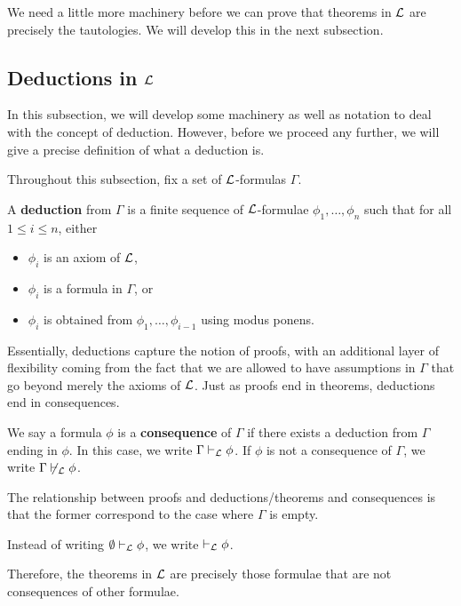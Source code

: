 We need a little more machinery before we can prove that theorems in $\mathcal{L}$ are precisely the tautologies. We will develop this in the next subsection.

\subsection{Deductions in $\mathcal{L}$}

In this subsection, we will develop some machinery as well as notation to deal with the concept of deduction. However, before we proceed any further, we will give a precise definition of what a deduction is.

Throughout this subsection, fix a set of $\mathcal{L}$-formulas $\Gamma$.

\begin{boxdefinition}[Deduction]\label{Ch1:Def:Deduction}
    A \textbf{deduction} from $\Gamma$ is a finite sequence of $\mathcal{L}$-formulae $\phi_1, \ldots, \phi_n$ such that for all $1 \leq i \leq n$, either
    \begin{itemize}%
        \item $\phi_i$ is an axiom of $\mathcal{L}$,
        \item $\phi_i$ is a formula in $\Gamma$, or
        \item $\phi_i$ is obtained from $\phi_1, \ldots, \phi_{i-1}$ using modus ponens.
    \end{itemize}
\end{boxdefinition}

Essentially, deductions capture the notion of proofs, with an additional layer of flexibility coming from the fact that we are allowed to have assumptions in $\Gamma$ that go beyond merely the axioms of $\mathcal{L}$. Just as proofs end in theorems, deductions end in consequences.

\begin{boxdefinition}[Consequence]
    We say a formula $\phi$ is a \textbf{consequence} of $\Gamma$ if there exists a deduction from $\Gamma$ ending in $\phi$. In this case, we write $\Gamma \vdash_{\mathcal{L}} \phi$. If $\phi$ is not a consequence of $\Gamma$, we write $\Gamma \not\vdash_{\mathcal{L}} \phi$.
\end{boxdefinition}

The relationship between proofs and deductions/theorems and consequences is that the former correspond to the case where $\Gamma$ is empty.
\begin{boxconvention}
    Instead of writing $\emptyset \vdash_{\mathcal{L}} \phi$, we write $\vdash_{\mathcal{L}} \phi$.
\end{boxconvention}
Therefore, the theorems in $\mathcal{L}$ are precisely those formulae that are not consequences of other formulae.

